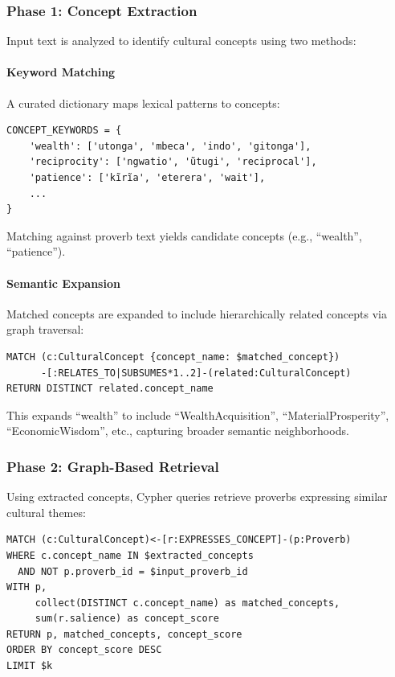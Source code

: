 \subsubsection{Phase 1: Concept Extraction}
\label{subsubsec:concept_extraction}

Input text is analyzed to identify cultural concepts using two methods:

\paragraph{Keyword Matching} A curated dictionary maps lexical patterns to concepts:
\begin{verbatim}
CONCEPT_KEYWORDS = {
    'wealth': ['utonga', 'mbeca', 'indo', 'gitonga'],
    'reciprocity': ['ngwatio', 'ũtugi', 'reciprocal'],
    'patience': ['kĩrĩa', 'eterera', 'wait'],
    ...
}
\end{verbatim}

Matching against proverb text yields candidate concepts (e.g., ``wealth'', ``patience'').

\paragraph{Semantic Expansion} Matched concepts are expanded to include hierarchically related concepts via graph traversal:
\begin{verbatim}
MATCH (c:CulturalConcept {concept_name: $matched_concept})
      -[:RELATES_TO|SUBSUMES*1..2]-(related:CulturalConcept)
RETURN DISTINCT related.concept_name
\end{verbatim}

This expands ``wealth'' to include ``WealthAcquisition'', ``MaterialProsperity'', ``EconomicWisdom'', etc., capturing broader semantic neighborhoods.

\subsubsection{Phase 2: Graph-Based Retrieval}
\label{subsubsec:graph_retrieval}

Using extracted concepts, Cypher queries retrieve proverbs expressing similar cultural themes:

\begin{verbatim}
MATCH (c:CulturalConcept)<-[r:EXPRESSES_CONCEPT]-(p:Proverb)
WHERE c.concept_name IN $extracted_concepts
  AND NOT p.proverb_id = $input_proverb_id
WITH p, 
     collect(DISTINCT c.concept_name) as matched_concepts,
     sum(r.salience) as concept_score
RETURN p, matched_concepts, concept_score
ORDER BY concept_score DESC
LIMIT $k
\end{verbatim}

